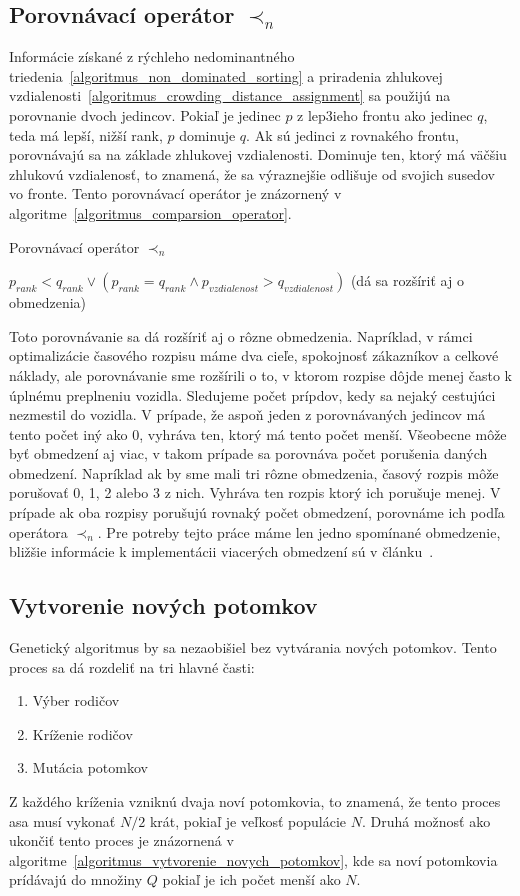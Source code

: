 \subsection*{Porovnávací operátor $\prec_n$}
Informácie získané z rýchleho nedominantného triedenia~\ref{algoritmus_non_dominated_sorting} a priradenia zhlukovej vzdialenosti~\ref{algoritmus_crowding_distance_assignment} sa použijú na porovnanie dvoch jedincov.
Pokiaľ je jedinec $p$ z lep3ieho frontu ako jedinec $q$, teda má lepší, nižší rank, $p$ dominuje $q$.
Ak sú jedinci z rovnakého frontu, porovnávajú sa na základe zhlukovej vzdialenosti.
Dominuje ten, ktorý má väčšiu zhlukovú vzdialenosť, to znamená, že sa výraznejšie odlišuje od svojich susedov vo fronte.
Tento porovnávací operátor je znázornený v algoritme~\ref{algoritmus_comparsion_operator}.

\vspace*{\dimexpr0.5\baselineskip\relax}
\begin{algorithm}[h]\label{algoritmus_comparsion_operator}
\caption{Porovnávací operátor $\prec_n$}
  \Return $p_{rank} < q_{rank} \vee (p_{rank} = q_{rank} \wedge p_{vzdialenost} > q_{vzdialenost})$\;
  (dá sa rozšíriť aj o obmedzenia)\;
\end{algorithm}

Toto porovnávanie sa dá rozšíriť aj o rôzne obmedzenia.
Napríklad, v rámci optimalizácie časového rozpisu máme dva cieľe, spokojnosť zákazníkov a celkové náklady, ale porovnávanie sme rozšírili o to, v ktorom rozpise dôjde menej často k úplnému preplneniu vozidla.
Sledujeme počet prípdov, kedy sa nejaký cestujúci nezmestil do vozidla.
V prípade, že aspoň jeden z porovnávaných jedincov má tento počet iný ako 0, vyhráva ten, ktorý má tento počet menší.
Všeobecne môže byť obmedzení aj viac, v takom prípade sa porovnáva počet porušenia daných obmedzení.
Napríklad ak by sme mali tri rôzne obmedzenia, časový rozpis môže porušovať 0, 1, 2 alebo 3 z nich.
Vyhráva ten rozpis ktorý ich porušuje menej.
V prípade ak oba rozpisy porušujú rovnaký počet obmedzení, porovnáme ich podľa operátora $\prec_n$.
Pre potreby tejto práce máme len jedno spomínané obmedzenie, bližšie informácie k implementácii viacerých obmedzení sú v článku~\cite{deb2002nsga}.

\subsection*{Vytvorenie nových potomkov}
Genetický algoritmus by sa nezaobišiel bez vytvárania nových potomkov.
Tento proces sa dá rozdeliť na tri hlavné časti:
\begin{enumerate}
  \item Výber rodičov
  \item Kríženie rodičov
  \item Mutácia potomkov
\end{enumerate}
Z každého kríženia vzniknú dvaja noví potomkovia, to znamená, že tento proces asa musí vykonať $N/2$ krát, pokiaľ je veľkosť populácie $N$.
Druhá možnosť ako ukončiť tento proces je znázornená v algoritme~\ref{algoritmus_vytvorenie_novych_potomkov}, kde sa noví potomkovia prídávajú do množiny $Q$ pokiaľ je ich počet menší ako $N$.

